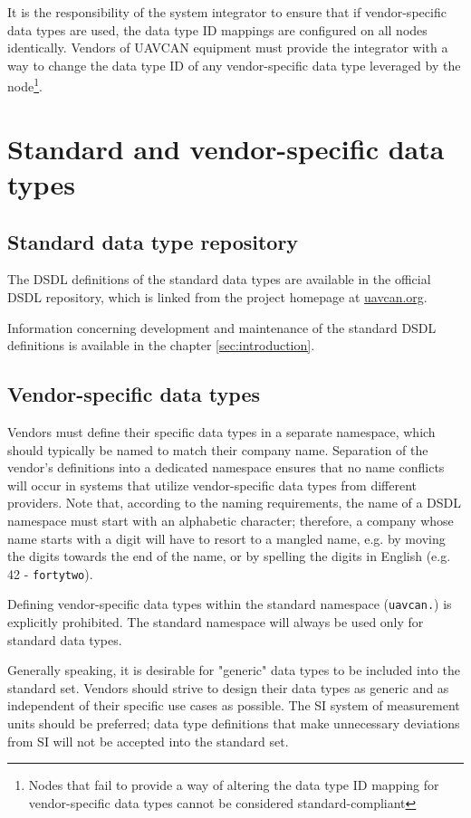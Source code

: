 It is the responsibility of the system integrator to ensure that if vendor-specific data types are
used, the data type ID mappings are configured on all nodes identically.
Vendors of UAVCAN equipment must provide the integrator with a way to change the data type ID
of any vendor-specific data type leveraged by the node\footnote{Nodes that fail to provide a way of
altering the data type ID mapping for vendor-specific data types cannot be considered standard-compliant}.

\section{Standard and vendor-specific data types}

\subsection{Standard data type repository}

The DSDL definitions of the standard data types are available in the official DSDL repository,
which is linked from the project homepage at \href{http://uavcan.org}{uavcan.org}.

Information concerning development and maintenance of the standard DSDL definitions is available
in the chapter \ref{sec:introduction}.

\subsection{Vendor-specific data types}

Vendors must define their specific data types in a separate namespace,
which should typically be named to match their company name.
Separation of the vendor's definitions into a dedicated namespace ensures that no name conflicts will occur
in systems that utilize vendor-specific data types from different providers.
Note that, according to the naming requirements, the name of a DSDL namespace must start
with an alphabetic character; therefore, a company whose name starts with a digit will have to resort to
a mangled name, e.g. by moving the digits towards the end of the name,
or by spelling the digits in English (e.g. 42 - \verb|fortytwo|).

Defining vendor-specific data types within the standard namespace (\verb|uavcan.|) is explicitly prohibited.
The standard namespace will always be used only for standard data types.

Generally speaking, it is desirable for "generic" data types to be included into the standard set.
Vendors should strive to design their data types as generic and as independent of their specific use
cases as possible.
The SI system of measurement units should be preferred;
data type definitions that make unnecessary deviations from SI will not be accepted into the standard set.

